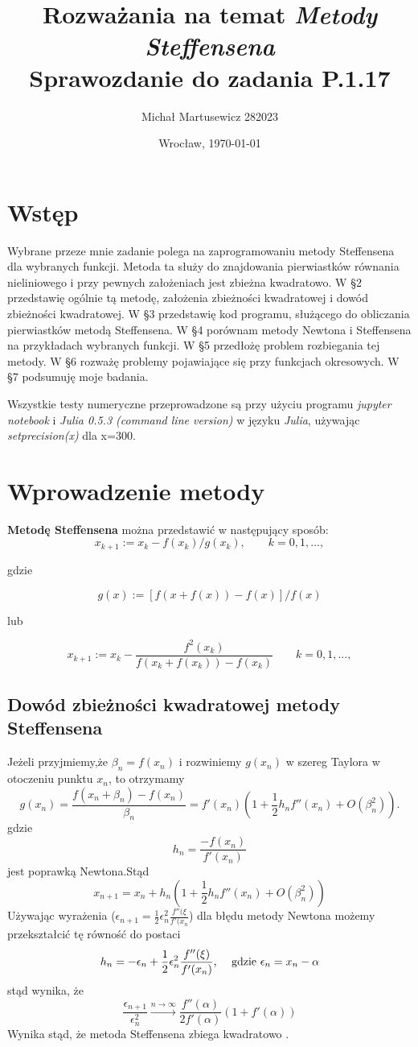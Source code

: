 \documentclass{article}
\author{Michał Martusewicz 282023}
\date{Wrocław, \today}
\title{\textbf{Rozważania na temat \textit{Metody Steffensena}}  \\ Sprawozdanie do zadania P.1.17}
\begin{document}
\maketitle
\section{Wstęp}

Wybrane przeze mnie zadanie polega na zaprogramowaniu metody Steffensena dla wybranych funkcji.
Metoda ta służy do znajdowania pierwiastków równania nieliniowego i przy pewnych założeniach jest zbieżna kwadratowo.
 W \S 2 przedstawię ogólnie tą metodę, założenia zbieżności kwadratowej i dowód zbieżności kwadratowej.
 W \S 3 przedstawię kod programu, służącego do obliczania pierwiastków metodą Steffensena.
 W \S 4 porównam metody Newtona i Steffensena na przykładach wybranych funkcji.
 W \S 5 przedłożę problem rozbiegania tej metody.
 W \S 6 rozważę problemy pojawiające się przy funkcjach okresowych.
 W \S 7 podsumuję moje badania.
 
Wszystkie testy numeryczne przeprowadzone są przy użyciu programu \textit{jupyter notebook} i \textit{Julia 0.5.3 (command line version)} w języku \textit{Julia}, używając 
\textit{setprecision(x)} dla x=300.
\section{Wprowadzenie metody}
\textbf{Metodę Steffensena} można przedstawić w następujący sposób:
$$
x_{k+1}:= x_k - f(x_k)/g(x_k),  \qquad k=0,1,...,
$$

gdzie


$$
g(x):=[f(x+f(x))-f(x)]/f(x)
$$

lub


$$
x_{k+1}:=x_k-\frac{f^2(x_k)}{f(x_k+f(x_k))-f(x_k)} \qquad k=0,1,...,
$$
\subsection{Dowód zbieżności kwadratowej metody Steffensena}
Jeżeli przyjmiemy,że $\beta _n =f(x_n)$ i rozwiniemy $g(x_n)$ w szereg Taylora w otoczeniu punktu $x_n$, to otrzymamy 
$$
g(x_n)=\frac{f(x_n+\beta _n)-f(x_n)}{\beta _n}=f'(x_n)\left(1+\frac{1}{2}h_n f''(x_n)+O(\beta _n^2)\right).
$$
gdzie
$$
h_n=\frac{-f(x_n)}{f'(x_n)}
$$
jest poprawką Newtona.Stąd
$$
	x_{n+1}=x_n+h_n\left(1+\frac{1}{2}h_nf''(x_n)+O(\beta_n^2)\right)
$$
Używając wyrażenia ($\epsilon_{n+1}=\frac{1}{2}\epsilon_n^2\frac{f''(\xi}{f'(x_n}$) dla błędu metody Newtona możemy przekształcić tę równość do postaci
$$
h_n=-\epsilon_n+\frac{1}{2}\epsilon_n^2\frac{f''(\xi)}{f'(x_n)}\textrm{, \quad gdzie $\epsilon_n=x_n-\alpha$} 
$$
stąd wynika, że 
$$
\frac{\epsilon_{n+1}}{\epsilon_n^2} \xrightarrow{n\rightarrow\infty} \frac{f''(\alpha)}{2f'(\alpha)}(1+f'(\alpha))
$$
Wynika stąd, że metoda Steffensena zbiega kwadratowo \cite{bib5}.
\end{document}
